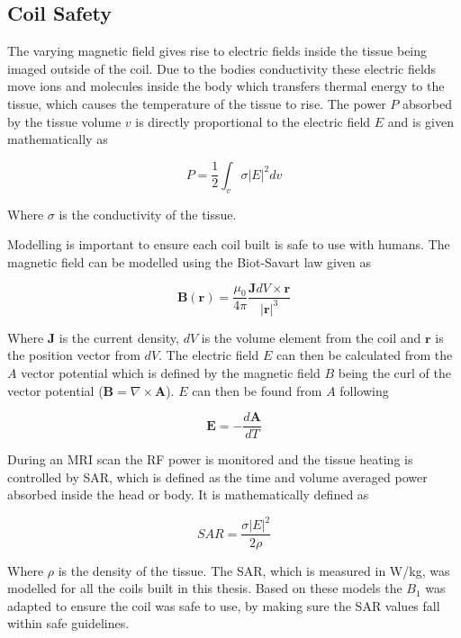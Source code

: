 \subsection{Coil Safety}

The varying magnetic field gives rise to electric fields inside the tissue being imaged outside of the coil. Due to the bodies conductivity these electric fields move ions and molecules inside the body which transfers thermal energy to the tissue, which causes the temperature of the tissue to rise. The power $P$ absorbed by the tissue volume $v$ is directly proportional to the electric field $E$ and is given mathematically as 

\begin{equation}
    P = \frac{1}{2}\int_v \sigma|E|^2dv
\end{equation}

Where $\sigma$ is the conductivity of the tissue. 

Modelling is important to ensure each coil built is safe to use with humans. The magnetic field can be modelled using the Biot-Savart law given as 

\begin{equation}
    \mathbf{B(r)} = \frac{\mu_0}{4\pi}\frac{\mathbf{J}dV \times \mathbf{r}}{|\mathbf{r}|^3}
\end{equation}

Where $\mathbf{J}$ is the current density, $dV$ is the volume element from the coil and $\mathbf{r}$ is the position vector from $dV$. The electric field $E$ can then be calculated from the $A$ vector potential which is defined by the magnetic field $B$ being the curl of the vector potential ($\mathbf{B} = \nabla \times \mathbf{A}$). $E$ can then be found from $A$ following

\begin{equation}
    \mathbf{E} = -\frac{d\mathbf{A}}{dT}
\end{equation}

During an \ac{MRI} scan the \ac{RF} power is monitored and the tissue heating is controlled by \ac{SAR}, which is defined as the time and volume averaged power absorbed inside the head or body. It is mathematically defined as 

\begin{equation}
    SAR = \frac{\sigma|E|^2}{2\rho}
\end{equation}

Where $\rho$ is the density of the tissue. The \ac{SAR}, which is measured in W/kg, was modelled for all the coils built in this thesis. Based on these models the $B_1$ was adapted to ensure the coil was safe to use, by making sure the \ac{SAR} values fall within safe guidelines.

